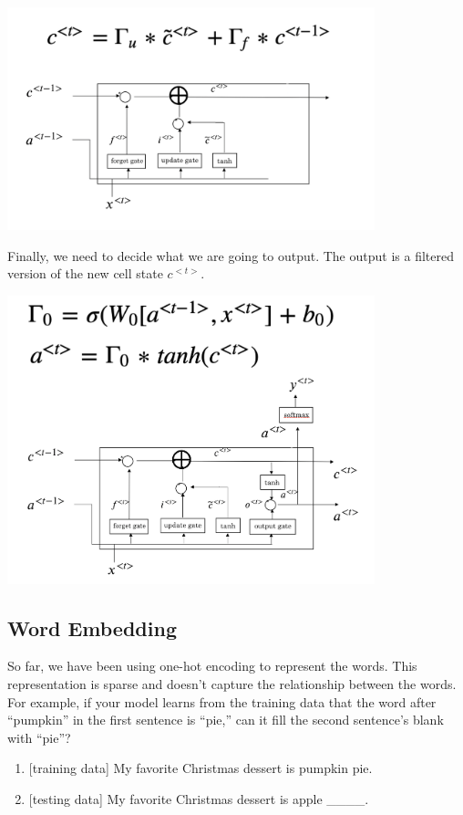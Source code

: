\documentclass[
  12pt,
]{krantz}
\providecommand{\tightlist}{%
  \setlength{\itemsep}{0pt}\setlength{\parskip}{0pt}}
\begin{document}
\includegraphics[width=0.8\textwidth,height=\textheight]{images/lstm3.png}

Finally, we need to decide what we are going to output. The output is a filtered version of the new cell state \(c^{<t>}\).

\includegraphics[width=0.8\textwidth,height=\textheight]{images/lstm4.png}

\hypertarget{embedding}{%
\subsection{Word Embedding}\label{embedding}}

So far, we have been using one-hot encoding to represent the words. This representation is sparse and doesn't capture the relationship between the words. For example, if your model learns from the training data that the word after ``pumpkin'' in the first sentence is ``pie,'' can it fill the second sentence's blank with ``pie''?

\begin{enumerate}
\def\labelenumi{\arabic{enumi}.}
\tightlist
\item
  {[}training data{]} My favorite Christmas dessert is pumpkin pie.
\item
  {[}testing data{]} My favorite Christmas dessert is apple \_\_\_\_.
\end{enumerate}
\end{document}
